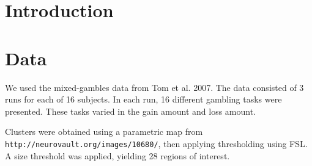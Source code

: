 \documentclass[12pt]{article}
\begin{document}
\maketitle

\newcommand{\tr}{\text{tr}}
\newcommand{\E}{\textbf{E}}
\newcommand{\diag}{\text{diag}}
\newcommand{\argmax}{\text{argmax}}
\newcommand{\Cov}{\text{Cov}}
\newcommand{\Var}{\text{Var}}
\newcommand{\argmin}{\text{argmin}}
\newcommand{\Vol}{\text{Vol}}
\newcommand{\comm}[1]{}

\newcommand{\bx}{\boldsymbol{x}}
\newcommand{\by}{\boldsymbol{y}}
\newcommand{\bX}{\boldsymbol{X}}
\newcommand{\bY}{\boldsymbol{Y}}


\section{Introduction}

\section{Data}

We used the mixed-gambles data from Tom et al. 2007.
The data consisted of 3 runs for each of 16 subjects.
In each run, 16 different gambling tasks were presented.
These tasks varied in the gain amount and loss amount.

Clusters were obtained using a parametric map from {\tt http://neurovault.org/images/10680/},
then applying thresholding using FSL.
A size threshold was applied, yielding 28 regions of interest.
\end{document}
